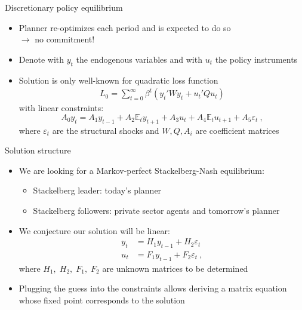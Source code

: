\documentclass[handout,usepdftitle=false,xcolor=dvipsnames,aspectratio=169]{beamer}
\begin{document}
\begin{frame}{Discretionary policy equilibrium}
  \begin{itemize}
    \item Planner re-optimizes each period and is expected to do so\\
          $\rightarrow$ no commitment!
    \item Denote with $y_t$ the endogenous variables and with $u_t$ the policy instruments
    \item Solution is only well-known for quadratic loss function
          \begin{align}
            L_0 = \sum_{t=0}^\infty \beta^{t}(y_t'Wy_t + u_t'Qu_t)
          \end{align}
          with linear constraints:
          \begin{equation}
            A_0 y_t = A_1y_{t-1} + A_2\mathbb{E}_t y_{t+1} + A_3
            u_t + A_4 \mathbb{E}_t u_{t+1} + A_5 \varepsilon_t \: ,
          \end{equation}
          where $\varepsilon_t$ are the structural shocks and $W,Q,A_i$ are coefficient matrices
  \end{itemize}
\end{frame}

\begin{frame}{Solution structure}
  \begin{itemize}
    \item We are looking for a Markov-perfect Stackelberg-Nash equilibrium:
          \begin{itemize}
            \item Stackelberg leader: today's planner
            \item Stackelberg followers: private sector agents and tomorrow's planner
          \end{itemize}
    \item We conjecture our solution will be linear:
          \begin{align}
            y_t & = H_1 y_{t-1} + H_2 \varepsilon_t \\
            u_t & = F_1 y_{t-1} + F_2 \varepsilon_t \: ,
          \end{align}
          where $H_1,\;H_2,\;F_1,\;F_2$ are unknown matrices to be determined
    \item Plugging the guess into the constraints allows deriving a matrix equation whose fixed point corresponds to the solution
  \end{itemize}
\end{frame}
\end{document}
